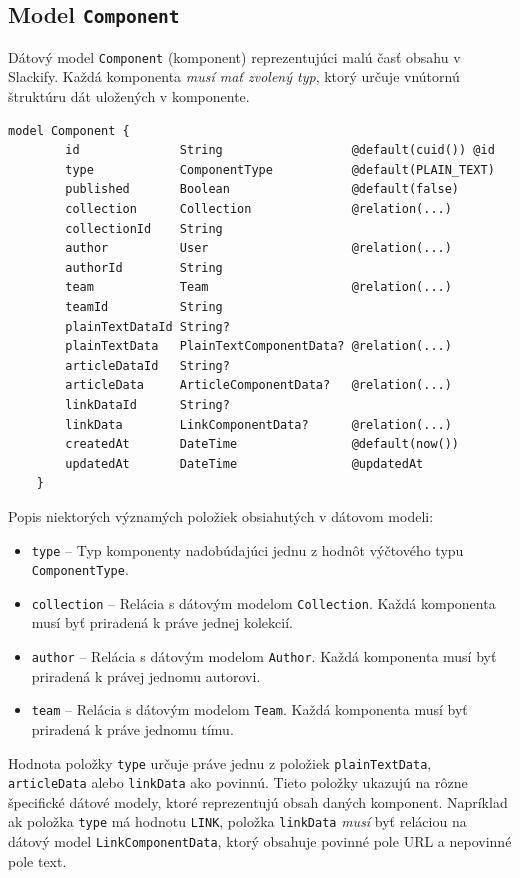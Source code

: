 \subsection{Model \texttt{Component}}
\label{impl:model:component}
Dátový model \texttt{Component} (komponent) reprezentujúci malú časť obsahu v Slackify. Každá komponenta \emph{musí mať zvolený typ}, ktorý určuje vnútornú štruktúru dát uložených v komponente. \\

\begin{lstlisting}[caption=Dátový model \texttt{Component} v konfiguračnom súbore \texttt{prisma}.]
	model Component {
		id              String                  @default(cuid()) @id
		type            ComponentType           @default(PLAIN_TEXT)
		published       Boolean                 @default(false)
		collection      Collection              @relation(...)
		collectionId    String
		author          User                    @relation(...)
		authorId        String
		team            Team                    @relation(...)
		teamId          String
		plainTextDataId String?
		plainTextData   PlainTextComponentData? @relation(...)
		articleDataId   String?
		articleData     ArticleComponentData?   @relation(...)
		linkDataId      String?
		linkData        LinkComponentData?      @relation(...)
		createdAt       DateTime                @default(now())
		updatedAt       DateTime                @updatedAt
	}
\end{lstlisting}

\medskip

\noindent Popis niektorých významých položiek obsiahutých v dátovom modeli:

\begin{itemize}
	\item \texttt{type} -- Typ komponenty nadobúdajúci jednu z hodnôt výčtového typu \texttt{ComponentType}.
	\item \texttt{collection} -- Relácia s dátovým modelom \texttt{Collection}. Každá komponenta musí byť priradená k práve jednej kolekcií.
	\item \texttt{author} -- Relácia s dátovým modelom \texttt{Author}. Každá komponenta musí byť priradená k právej jednomu autorovi.
	\item \texttt{team} -- Relácia s dátovým modelom \texttt{Team}. Každá komponenta musí byť priradená k práve jednomu tímu.
\end{itemize}

\noindent Hodnota položky \texttt{type} určuje práve jednu z položiek \texttt{plainTextData}, \texttt{articleData} alebo \texttt{linkData} ako povinnú. Tieto položky ukazujú na rôzne špecifické dátové modely, ktoré reprezentujú obsah daných komponent. Napríklad ak položka \texttt{type} má hodnotu \texttt{LINK}, položka \texttt{linkData} \emph{musí} byť reláciou na dátový model \texttt{LinkComponentData}, ktorý obsahuje povinné pole URL a nepovinné pole text. \\

